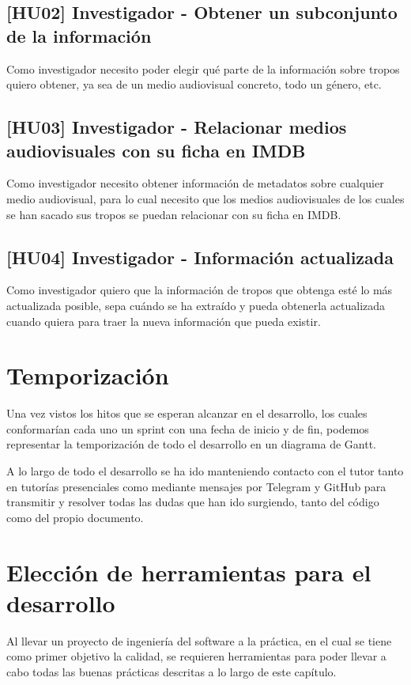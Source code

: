 \subsection{[HU02] Investigador - Obtener un subconjunto de la información}
Como investigador necesito poder elegir qué parte de la información sobre tropos
quiero obtener, ya sea de un medio audiovisual concreto, todo un género, etc.

\subsection{[HU03] Investigador - Relacionar medios audiovisuales con su ficha en IMDB}
Como investigador necesito obtener información de metadatos sobre cualquier
medio audiovisual, para lo cual necesito que los medios audiovisuales de los
cuales se han sacado sus tropos se puedan relacionar con su ficha en IMDB.

\subsection{[HU04] Investigador - Información actualizada}
Como investigador quiero que la información de tropos que obtenga esté lo más
actualizada posible, sepa cuándo se ha extraído y pueda obtenerla actualizada
cuando quiera para traer la nueva información que pueda existir.

\section{Temporización}
Una vez vistos los hitos que se esperan alcanzar en el desarrollo, los cuales
conformarían cada uno un sprint con una fecha de inicio y de fin, podemos
representar la temporización de todo el desarrollo en un diagrama de Gantt.

A lo largo de todo el desarrollo se ha ido manteniendo contacto con el tutor
tanto en tutorías presenciales como mediante mensajes por Telegram y GitHub para
transmitir y resolver todas las dudas que han ido surgiendo, tanto del código
como del propio documento.

\section{Elección de herramientas para el desarrollo}
Al llevar un proyecto de ingeniería del software a la práctica, en el cual se
tiene como primer objetivo la calidad, se requieren herramientas para poder
llevar a cabo todas las buenas prácticas descritas a lo largo de este capítulo. 

